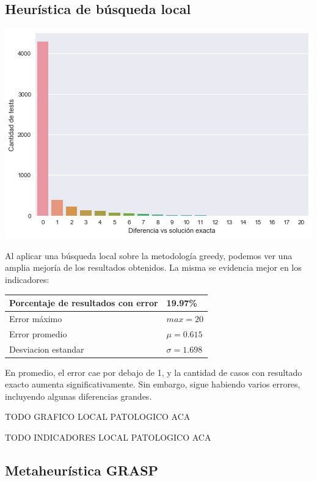 \subsection*{Heurística de búsqueda local}

\begin{center}
    \includegraphics[scale=0.6]{img/accuracy-local.png}
\end{center}

Al aplicar una búsqueda local sobre la metodología greedy, podemos ver una amplia mejoría de los resultados obtenidos. La misma se evidencia mejor en los indicadores:

\begin{center}
    \begin{tabular}{ | l l |}
        \hline
        Porcentaje de resultados con error & 19.97\% \\ \hline
        Error máximo & $max = 20$ \\ \hline
        Error promedio & $\mu = 0.615$ \\ \hline
        Desviacion estandar & $\sigma = 1.698$ \\
        \hline
    \end{tabular}
\end{center}

En promedio, el error cae por debajo de 1, y la cantidad de casos con resultado exacto aumenta significativamente. Sin embargo, sigue habiendo varios errores, incluyendo algunas diferencias grandes.

TODO GRAFICO LOCAL PATOLOGICO ACA

TODO INDICADORES LOCAL PATOLOGICO ACA

\subsection*{Metaheurística GRASP}

